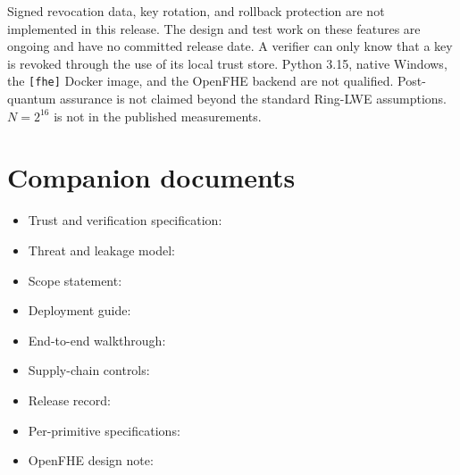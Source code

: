 \documentclass[10pt,a4paper]{article}
\begin{document}
Signed revocation data, key rotation, and rollback protection are not implemented in this release. The design and test work on these features are ongoing and have no committed release date. A verifier can only know that a key is revoked through the use of its local trust store. Python 3.15, native Windows, the \texttt{[fhe]} Docker image, and the OpenFHE backend are not qualified. Post-quantum assurance is not claimed beyond the standard Ring-LWE assumptions. $N=2^{16}$ is not in the published measurements.

\section*{Companion documents}

\begin{itemize}[leftmargin=*,itemsep=0pt]
  \item Trust and verification specification: 
  \item Threat and leakage model: 
  \item Scope statement: 
  \item Deployment guide: 
  \item End-to-end walkthrough: 
  \item Supply-chain controls: 
  \item Release record: 
  \item Per-primitive specifications: 
  \item OpenFHE design note: 
\end{itemize}
\end{document}
